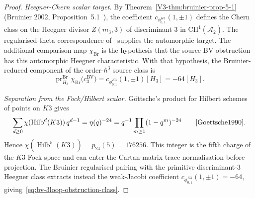 \begin{proof}
\emph{Heegner-Chern scalar target.}
By Theorem~\ref{V3-thm:bruinier-prop-5-1} (Bruinier 2002,
Proposition~5.1~\cite{Bruinier2002}), the coefficient
\(c_{\phi_{0,1}^{K3}}(1,\pm1)\) defines the Chern class on the Heegner divisor
$Z(m_3,3)$ of discriminant $3$ in
$\mathrm{CH}^1(\overline{\mathcal{A}_2})$. The regularised-theta
correspondence of~\cite[Ch.~5, Thm.~5.12]{Bruinier2002} supplies the
automorphic target. The additional comparison map \(\chi_{\mathrm{Br}}\)
is the hypothesis that the source BV obstruction has this automorphic
Heegner characteristic. With that hypothesis, the Bruinier-reduced
component of the order-\(\hbar^3\) source class is
\[
 \operatorname{pr}_{H_3}^{\mathrm{Br}}
 \chi_{\mathrm{Br}}\bigl(c_3^{\mathrm{BV}}\bigr)
 =
 c_{\phi_{0,1}^{K3}}(1,\pm1)[H_3]=-64[H_3].
\]

\emph{Separation from the Fock/Hilbert scalar.}
G\"ottsche's product for Hilbert schemes of points on $K3$ gives
\[
 \sum_{d\geq 0}\chi(\operatorname{Hilb}^d(K3))\,q^{d-1}
 =
 \eta(q)^{-24}
 =
 q^{-1}\prod_{m\geq 1}(1-q^m)^{-24}
 \qquad\text{\cite{Goettsche1990}}.
\]
Hence $\chi(\operatorname{Hilb}^5(K3))=p_{24}(5)=176256$. This integer
is the fifth charge of the $K3$ Fock space and can enter the
Cartan-matrix trace normalisation before projection. The Bruinier
regularised pairing with the primitive discriminant-$3$ Heegner class
extracts instead the weak-Jacobi coefficient
\(c_{\phi_{0,1}^{K3}}(1,\pm1)=-64\), giving~\eqref{eq:bv-3loop-obstruction-class}.

\end{proof}

